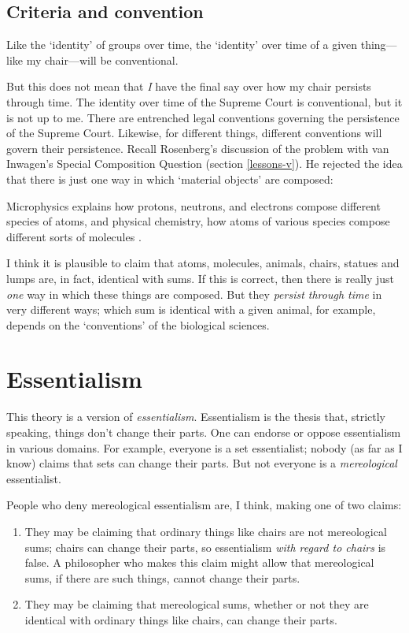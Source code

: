 \documentclass[11pt]{article}
\newenvironment{squote}{%
\begin{spacing}{1}
\begin{list}{}{%
\setlength{\labelwidth}{0pt}%
\rightmargin\leftmargin%
}
\item\relax
}{%
\end{list}%
\end{spacing}
}
\begin{document}
\begin{spacing}{1.5}
\subsection{Criteria and convention}
\label{criteria}
Like the `identity' of groups over time, the `identity' over time of a
given thing---like my chair---will be conventional.

But this does not mean that {\em I} have the final say over how my
chair persists through time.  The identity over time of the Supreme
Court is conventional, but it is not up to me.  There are entrenched
legal conventions governing the persistence of the Supreme Court.
Likewise, for different things, different conventions will govern
their persistence.  Recall Rosenberg's discussion of the problem with
van Inwagen's Special Composition Question (section \ref{lessons-v}).
He rejected the idea that there is just one way in which `material
objects' are composed:

\begin{squote}
Microphysics explains how protons, neutrons, and electrons compose
different species of atoms, and physical chemistry, how atoms of
various species compose different sorts of molecules
\citep[706]{rosenberg1993}.
\end{squote}

I think it is plausible to claim that atoms, molecules, animals,
chairs, statues and lumps are, in fact, identical with sums.  If this
is correct, then there is really just {\em one} way in which these
things are composed.  But they {\em persist through time} in very
different ways; which sum is identical with a given animal, for
example, depends on the `conventions' of the biological sciences.

\section{Essentialism}
\label{essentialism}
This theory is a version of {\em essentialism}.  Essentialism is the
thesis that, strictly speaking, things don't change their parts.  One
can endorse or oppose essentialism in various domains.  For example,
everyone is a set essentialist; nobody (as far as I know) claims that
sets can change their parts.  But not everyone is a {\em mereological}
essentialist.

People who deny mereological essentialism are, I think, making one of
two claims:

\begin{enumerate}
  \item They may be claiming that ordinary things like chairs are not
    mereological sums; chairs can change their parts, so essentialism
    {\em with regard to chairs} is false.  A philosopher who makes
    this claim might allow that mereological sums, if there are such
    things, cannot change their parts.
  \item They may be claiming that mereological sums, whether or not
    they are identical with ordinary things like chairs, can change
    their parts.
\end{enumerate}


\end{spacing}
\end{document}
